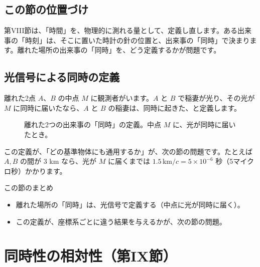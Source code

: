 \documentclass[a4paper,11pt,openany]{ltjsbook}
\begin{document}
\section{この節の位置づけ}

第VIII節は、「時間」を、物理的に測れる量として、定義し直します。ある出来事の「時刻」は、そこに置いた時計の針の位置と、出来事の「同時」で決まります。離れた場所の出来事の「同時」を、どう定義するかが問題です。

\section{光信号による同時の定義}

離れた2点 $A$、$B$ の中点 $M$ に観測者がいます。$A$ と $B$ で稲妻が光り、その光が $M$ に同時に届いたなら、$A$ と $B$ の稲妻は、同時に起きた、と定義します。

\begin{figure}[htbp]
\centering
{}
\caption{離れた2つの出来事の「同時」の定義。中点 $M$ に、光が同時に届いたとき。}
\end{figure}

この定義が、「どの基準物体にも通用するか」が、次の節の問題です。たとえば $A,B$ の間が $3$ km なら、光が $M$ に届くまでは $1.5\,\text{km}/c=5\times10^{-6}$ 秒（5マイクロ秒）かかります。

\begin{pointbox}{この節のまとめ}
\begin{itemize}[leftmargin=*]
\item 離れた場所の「同時」は、光信号で定義する（中点に光が同時に届く）。
\item この定義が、座標系ごとに違う結果を与えるかが、次の節の問題。
\end{itemize}
\end{pointbox}

\chapter{同時性の相対性（第IX節）}
\end{document}
